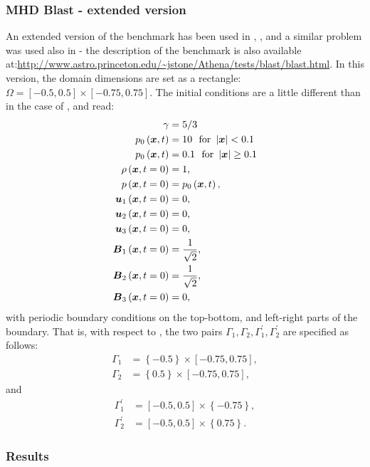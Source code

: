 \subsubsection{MHD Blast - extended version}
\label{sec:blastNew}
An extended version of the benchmark has been used in \cite{blastNew1}, \cite{athenaBlast}, and a similar problem was used also in \cite{blastNew2} - the description of the benchmark is also available at:\url{http://www.astro.princeton.edu/~jstone/Athena/tests/blast/blast.html}.
In this version, the domain dimensions are set as a rectangle: $\Omega = [-0.5, 0.5] \times [-0.75, 0.75]$.
The initial conditions are a little different than in the case of , and read:
\begin{align}
\label{mhdBlastNew}
\gamma & =  5 / 3\\ \nonumber
p_0\left(\mbox{\boldmath $x$}, t\right) & =  10\ \ \text{for}\ \left|\mbox{\boldmath $x$}\right| < 0.1\\ \nonumber
p_0\left(\mbox{\boldmath $x$}, t\right) & =  0.1\ \ \text{for}\ \left|\mbox{\boldmath $x$}\right| \geq 0.1\\ \nonumber
\rho\left(\mbox{\boldmath $x$}, t = 0\right) & =  1,\\ \nonumber
p\left(\mbox{\boldmath $x$}, t = 0\right) & =  p_0\left(\mbox{\boldmath $x$}, t\right),\\ \nonumber
\mbox{\boldmath $u$}_1\left(\mbox{\boldmath $x$}, t = 0\right) & =  0,\\ \nonumber
\mbox{\boldmath $u$}_2\left(\mbox{\boldmath $x$}, t = 0\right) & =  0,\\ \nonumber
\mbox{\boldmath $u$}_3\left(\mbox{\boldmath $x$}, t = 0\right) & =  0,\\ \nonumber
\mbox{\boldmath $B$}_1\left(\mbox{\boldmath $x$}, t = 0\right) & =  \frac{1}{\sqrt{2}},\\ \nonumber
\mbox{\boldmath $B$}_2\left(\mbox{\boldmath $x$}, t = 0\right) & =  \frac{1}{\sqrt{2}},\\ \nonumber
\mbox{\boldmath $B$}_3\left(\mbox{\boldmath $x$}, t = 0\right) & =  0,
\end{align}
with periodic boundary conditions on the top-bottom, and left-right parts of the boundary. That is, with respect to , the two pairs $\Gamma_1, \Gamma_2, \Gamma_1^{'}, \Gamma_2^{'}$ are specified as follows:
\begin{align}
\Gamma_1 & = \left\{-0.5\right\} \times [-0.75, 0.75],\\
\Gamma_2 & = \left\{0.5\right\} \times [-0.75, 0.75],
\end{align}
and
\begin{align}
\Gamma_1^{'} & = [-0.5, 0.5] \times \left\{-0.75\right\},\\
\Gamma_2^{'} & = [-0.5, 0.5] \times \left\{0.75\right\}.
\end{align}

\subsubsection{Results}


